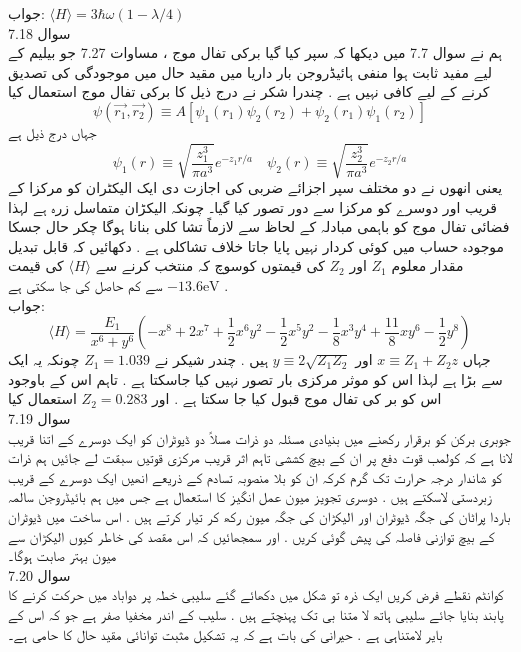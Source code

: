 جواب:
\(\langle H \rangle =3\hbar\omega(1-\lambda/4)\)\\
سوال 
7.18\\
ہم نے سوال 7.7 میں دیکھا کہ سپر کیا گیا برکی تفال موج ، مساوات 7.27 جو بیلیم کے لیے مفید ثابت ہوا منفی ہائیڈروجن بار داریا میں مقید حال میں موجودگی کی تصدیق کرنے کے لیے کافی نہیں ہے . چندرا شكر نے درج ذیل کا برکی تفال موج استعمال کیا
\[\psi(\vec{r_{1}},\vec{r_{2}})\equiv A[\psi_{1}(r_{1})\psi_{2}(r_{2})+\psi_{2}(r_{1})\psi_{1}(r_{2})]\]
جہاں درج ذیل ہے
\[\psi_{1}(r)\equiv \sqrt{\frac{z_{1}^{3}}{\pi a^{3}}}e^{-z_{1}r/a}  \quad  \psi_{2}(r)\equiv \sqrt{\frac{z_{2}^{3}}{\pi a^{3}}}e^{-z_{2}r/a}\] 
یعنی انھوں نے دو مختلف سپر اجزائے ضربی کی اجازت دی ایک الیکٹران کو مرکزا کے قریب اور دوسرے کو مرکزا سے دور تصور کیا گیا۔ چونکہ الیکڑان متماسل زرہ ہے لہذا فضائی تفال موج کو باہمی مبادلہ کے لحاظ سے لازماً  تشا کلی بنانا ہوگا چکر حال جسکا موجودہ حساب میں کوئی کردار نہیں پایا جاتا خلاف تشاکلی ہے . دکھائیں کہ قابل تبدیل مقدار معلوم
\(Z_{1}\)
اور
\(Z_{2}\)
کی قیمتوں کوسوچ کہ منتخب کرنے سے
\(\langle H \rangle \) 
کی قیمت
\(-13.6\text{eV}\)
سے کم حاصل کی جا سکتی ہے .\\
جواب:
\[\langle H \rangle = \frac{E_{1}}{x^{6}+y^{6}}(-x^{8}+2x^{7}+\frac{1}{2}x^{6}y^{2}-\frac{1}{2}x^{5}y^{2}-\frac{1}{8}x^{3}y^{4}+\frac{11}{8}xy^{6}-\frac{1}{2}y^{8})\]
جہاں
\(x\equiv Z_{1}+Z_{2}z\)
اور
\(y\equiv2\sqrt{Z_{1}Z_{2}}\)
ہیں . چندر شیکر نے
\(Z_{1}=1.039\)
چونکہ یہ ایک سے بڑا ہے لہذا اس کو موثر مرکزی بار تصور نہیں کیا جاسکتا  ہے . تاہم اس کے باوجود اس کو بر کی تفال موج قبول کیا جا سکتا ہے . اور
\(Z_{2}=0.283\)
استعمال کیا\\
سوال 
7.19\\
جوبری برکن کو برقرار رکھنے میں بنیادی مسئلہ دو ذرات مسلاً دو ڈیوٹران کو ایک دوسرے کے اتنا قریب لانا ہے کہ کولمب قوت دفع پر ان کے بیچ کششی تاہم اثر قریب مرکزی قوتیں سبقت لے جائیں ہم ذرات کو شاندار درجہ حرارت تک گرم کرکہ ان کو بلا منصوبہ تسادم کے ذریعے انھیں ایک دوسرے کے قریب زبردستی لاسکتے ہیں . دوسری تجویز میون عمل انگیز کا استعمال ہے جس میں ہم بائیڈروجن سالمہ باردا پراٹان کی جگہ ڈیوٹران اور الیکڑان کی جگہ میون رکھ کر تیار کرتے ہیں . اس ساخت میں ڈیوٹران کے بیچ توازنی فاصلہ کی پیش گوئی کریں . اور سمجھائیں کہ اس مقصد کی خاطر کیوں الیکڑان سے میون بہتر صابت ہوگا۔\\
سوال 
7.20\\
کوانٹم نقطے فرض کریں ایک ذرہ تو شکل    میں دکھائے گئے سلیبی خطہ پر دواباد میں حرکت کرنے کا پابند بنایا جائے سلیبی ہاتھ لا متنا بی تک پہنچتے ہیں . سلیب کے اندر مخفیا صفر ہے جو کہ اس کے بایر لامتناہی ہے . حیرانی کی بات ہے کہ یہ تشکیل  مثبت  توانائی مقید حال کا حامی ہے۔

